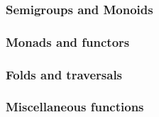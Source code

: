 






\subsubsection{Semigroups and Monoids}

\subsubsection{Monads and functors}

\subsubsection{Folds and traversals}

\subsubsection{Miscellaneous functions}

%